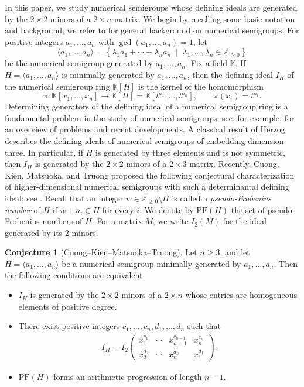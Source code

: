 \documentclass[12pt]{amsart}
\numberwithin{equation}{section}
\theoremstyle{definition}
\newtheorem{conjecture}[theorem]{Conjecture}
\newcommand{\PF}{\mathrm{PF}}
\newcommand{\F}{\mathbb{K}}
\begin{document}
In this paper, we study numerical semigroups whose defining ideals are generated by the $2\times 2$ minors of a $2\times n$ matrix.
We begin by recalling some basic notation and background; we refer to \cite{RGS} for general background on numerical semigroups. For positive integers $a_1,\dots,a_n$ with $\gcd(a_1,\dots,a_n)=1$, let
\[
\langle a_1,\dots,a_n\rangle
=
\left\{
\lambda_1a_1+\cdots+\lambda_n a_n
\;\middle|\;
\lambda_1,\dots,\lambda_n\in \mathbb Z_{\geq 0}
\right\}
\]
be the numerical semigroup generated by $a_1,\dots,a_n$.
Fix a field $\F$. If
$H=\langle a_1,\dots,a_n\rangle$
is minimally generated by $a_1,\dots,a_n$, then the defining ideal $I_H$ of the numerical semigroup ring $\F[H]$ is the kernel of the homomorphism
\[
\pi:\F[x_1,\dots,x_n]\longrightarrow \F[H]=\F[t^{a_1},\dots,t^{a_n}],
\qquad
\pi(x_i)=t^{a_i}.
\]
Determining generators of the defining ideal of a numerical semigroup ring is a fundamental problem in the study of numerical semigroups; see, for example, \cite{MS} for an overview of problems and recent developments.
A classical result of Herzog \cite{Herzog} describes the defining ideals of numerical semigroups of embedding dimension three. In particular, if $H$ is generated by three elements and is not symmetric, then $I_H$ is generated by the $2\times2$ minors of a $2\times3$ matrix.
Recently, Cuong, Kien, Matsuoka, and Truong proposed the following conjectural characterization of higher-dimensional numerical semigroups with such a determinantal defining ideal; see \cite[Conjecture 1.1]{KMO}. Recall that an integer
$w\in \mathbb Z_{\geq0}\setminus H$
is called a \emph{pseudo-Frobenius number} of $H$ if
$w+a_i\in H$
for every $i$. We denote by $\PF(H)$ the set of pseudo-Frobenius numbers of $H$.
For a matrix $M$, we write $I_2(M)$ for the ideal generated by its
$2$-minors.

\begin{conjecture}[Cuong--Kien--Matsuoka--Truong]
\label{conj}
Let $n\geq3$, and let
$H=\langle a_1,\dots,a_n\rangle$
be a numerical semigroup minimally generated by $a_1,\dots,a_n$. Then the following conditions are equivalent.
\begin{itemize}
    \item[(A)] $I_H$ is generated by the $2\times2$ minors of a
$2\times n$  whose entries are homogeneous elements of positive degree.
    \item[(B)] There exist positive integers $c_1,\dots,c_n,d_1,\dots,d_n$ such that
    \begin{align}
    \label{2minorideal}
    I_H
    =
    I_2
    \begin{pmatrix}
    x_1^{c_1} & \cdots & x_{n-1}^{c_{n-1}} & x_n^{c_n}\\
    x_2^{d_2} & \cdots & x_n^{d_n} & x_1^{d_1}
    \end{pmatrix}.
    \end{align}
    \item[(C)] $\PF(H)$ forms an arithmetic progression of length $n-1$.
\end{itemize}
\end{conjecture}
\end{document}
